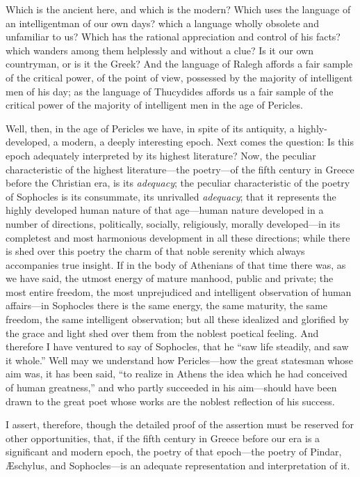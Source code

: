 Which is the ancient here, and which is the modern? Which uses the
language of an intelligentman of our own days? which a language wholly
obsolete and unfamiliar to us? Which has the rational appreciation and
control of his facts? which wanders among them helplessly and without a
clue? Is it our own countryman, or is it the Greek? And the language of
Ralegh affords a fair sample of the critical power, of the point of
view, possessed by the majority of intelligent men of his day; as the
language of Thucydides affords us a fair sample of the critical power of
the majority of intelligent men in the age of Pericles.

Well, then, in the age of Pericles we have, in spite of its antiquity, a
highly-developed, a modern, a deeply interesting epoch. Next comes the
question: Is this epoch adequately interpreted by its highest
literature? Now, the peculiar characteristic of the highest
literature---the poetry---of the fifth century in Greece before the
Christian era, is its \emph{adequacy}; the peculiar characteristic of
the poetry of Sophocles is its consummate, its unrivalled
\emph{adequacy}; that it represents the highly developed human nature of
that age---human nature developed in a number of directions,
politically, socially, religiously, morally developed---in its
completest and most harmonious development in all these directions;
while there is shed over this poetry the charm of that noble serenity
which always accompanies true insight. If in the body of Athenians of
that time there was, as we have said, the utmost energy of mature
manhood, public and private; the most entire freedom, the most
unprejudiced and intelligent observation of human affairs---in Sophocles
there is the same energy, the same maturity, the same freedom, the same
intelligent observation; but all these idealized and glorified by the
grace and light shed over them from the noblest poetical feeling. And
therefore I have ventured to say of Sophocles, that he ``saw life
steadily, and saw it whole.'' Well may we understand how Pericles---how
the great statesman whose aim was, it has been said, ``to realize in
Athens the idea which he had conceived of human greatness,'' and who
partly succeeded in his aim---should have been drawn to the great poet
whose works are the noblest reflection of his success.

I assert, therefore, though the detailed proof of the assertion must be
reserved for other opportunities, that, if the fifth century in Greece
before our era is a significant and modern epoch, the poetry of that
epoch---the poetry of Pindar, Æschylus, and Sophocles---is an adequate
representation and interpretation of it.

